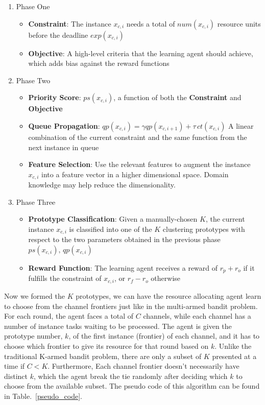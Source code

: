 \documentclass[conference]{IEEEtran}
\begin{document}
\begin{enumerate}
	\item Phase One
	\begin{itemize}
		\item \textbf{Constraint}: The instance $x_{c,i}$ needs a total of $num(x_{c,i})$ resource units before the deadline $exp(x_{c,i})$
		\item \textbf{Objective}: A high-level criteria that the learning agent should achieve, which adds bias against the reward functions
	\end{itemize}
	\item Phase Two
	\begin{itemize}
		\item \textbf{Priority Score}: $ps(x_{c,i})$, a function of both the \textbf{Constraint} and \textbf{Objective}
		\item \textbf{Queue Propagation}: $qp(x_{c,i}) = \gamma qp(x_{c,i+1}) + \tau \,ct(x_{c,i})$ A linear combination of the current constraint and the same function from the next instance in queue
		\item \textbf{Feature Selection}: Use the relevant features to augment the instance $x_{c,i}$ into a feature vector in a higher dimensional space. Domain knowledge may help reduce the dimensionality.
	\end{itemize}
	\item Phase Three
	\begin{itemize}
		\item \textbf{Prototype Classification}: Given a manually-chosen $K$, the current instance $x_{c,i}$ is classified into one of the $K$ clustering prototypes with respect to the two parameters obtained in the previous phase $ps(x_{c,i}),\, qp(x_{c,i})$
		\item \textbf{Reward Function}: The learning agent receives a reward of $r_p+r_o$ if it fulfills the constraint of $x_{c,i}$, or $r_f-r_o$ otherwise
	\end{itemize}
\end{enumerate}

Now we formed the $K$ prototypes, we can have the resource allocating agent learn to choose from the channel frontiers just like in the multi-armed bandit problem. For each round, the agent faces a total of $C$ channels, while each channel has a number of instance tasks waiting to be processed. The agent is given the prototype number, $k$, of the first instance (frontier) of each channel, and it has to choose which frontier to give its resource for that round based on $k$. Unlike the traditional K-armed bandit problem, there are only a subset of $K$ presented at a time if $C < K$. Furthermore, Each channel frontier doesn't necessarily have distinct $k$, which the agent break the tie randomly after deciding which $k$ to choose from the available subset. The pseudo code of this algorithm can be found in Table.~\ref{pseudo_code}.
\end{document}
